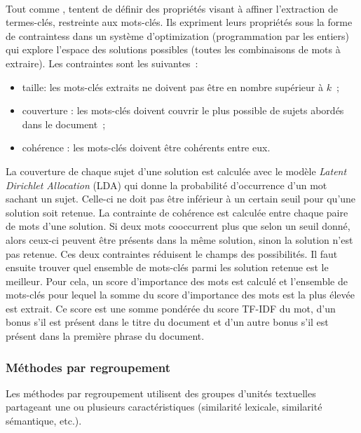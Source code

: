         \label{subsubsec:main-state_of_the_art-automatic_keyphrase_extraction-unsupervised_keyphrase_extraction-statistical_approaches:ilp}
        ~\\Tout comme ,
         tentent de définir des
        propriétés visant à affiner l'extraction de termes-clés, restreinte aux
        mots-clés. Ils expriment leurs propriétés sous la forme de contraintess
        dans un système d'optimization (programmation par les entiers) qui
        explore l'espace des solutions possibles (toutes les combinaisons de
        mots à extraire). Les contraintes sont les suivantes~:
        \begin{itemize}
          \item{taille: les mots-clés extraits ne doivent pas être en nombre
                supérieur à $k$~;}
          \item{couverture : les mots-clés doivent couvrir le plus possible de
                sujets abordés dans le document~;}
          \item{cohérence : les mots-clés doivent être cohérents entre eux.}
        \end{itemize}
        La couverture de chaque sujet d'une solution est calculée avec le modèle
        \textit{Latent Dirichlet Allocation} (LDA) \cite{blei2003lda} qui donne
        la probabilité d'occurrence d'un mot sachant un sujet. Celle-ci ne doit
        pas être inférieur à un certain seuil pour qu'une solution soit retenue.
        La contrainte de cohérence est calculée entre chaque paire de mots d'une
        solution. Si deux mots cooccurrent plus que selon un seuil donné, alors
        ceux-ci peuvent être présents dans la même solution, sinon la solution
        n'est pas retenue. Ces deux contraintes réduisent le champs des
        possibilités. Il faut ensuite trouver quel ensemble de mots-clés parmi
        les solution retenue est le meilleur. Pour cela, un score d'importance
        des mots est calculé et l'ensemble de mots-clés pour lequel la somme du
        score d'importance des mots est la plus élevée est extrait. Ce score est
        une somme pondérée du score TF-IDF du mot, d'un bonus s'il est présent
        dans le titre du document et d'un autre bonus s'il est présent dans la
        première phrase du document.

      \subsubsection{Méthodes par regroupement}
      \label{subsubsec:main-state_of_the_art-automatic_keyphrase_extraction-unsupervised_keyphrase_extraction-clustering_approaches}
        Les méthodes par regroupement utilisent des groupes d'unités textuelles
        partageant une ou plusieurs caractéristiques (similarité lexicale,
        similarité sémantique, etc.).

